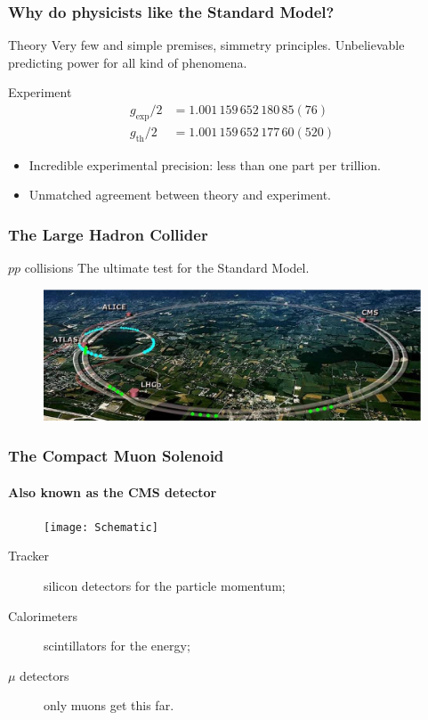 \documentclass[ukenglish]{beamer}
\begin{document}
\begin{frame}
    \frametitle{Why do physicists like the Standard Model?}
    \begin{block}
        {Theory}
        Very few and simple premises, simmetry principles. Unbelievable
        predicting power for all kind of phenomena.
    \end{block}
    \begin{block}
        {Experiment}
        \begin{align*}
    g_{\text{exp}}/2 &= 1.001\,159\,652\,180\,85(76)\\
    g_{\text{th}}/2 &= 1.001\,159\,652\,177\,60(520)
        \end{align*}
        \begin{itemize}
            \item Incredible experimental precision: less than one part per
                trillion.
            \item Unmatched agreement between theory and experiment.
        \end{itemize}
    \end{block}
\end{frame}

\begin{frame}
    \frametitle{The Large Hadron Collider}
    \begin{block}
        {$pp$ collisions}
    The ultimate test for the Standard Model.
    \end{block}
    \begin{figure}[h!]
        \centering
        \includegraphics[width=.9\textwidth]{lhc}
    \end{figure}
\end{frame}

\begin{frame}
    \frametitle{The Compact Muon Solenoid}
    \framesubtitle{Also known as the CMS detector}
    \begin{figure}[h]
        \centering
            \texttt{[image: Schematic]}
    \end{figure}
    \begin{description}
        \item[Tracker] silicon detectors for the particle momentum;
        \item[Calorimeters] scintillators for the energy;
        \item[$\mu$ detectors] only muons get this far.
    \end{description}
\end{frame}
\end{document}
